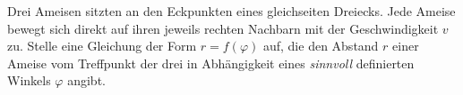 \begin{Exercise}[label = ants, difficulty = 3, title = Ameisen im Dreieck]
	Drei Ameisen sitzten an den Eckpunkten eines gleichseiten Dreiecks. Jede Ameise bewegt sich direkt auf ihren jeweils rechten Nachbarn mit der Geschwindigkeit $v$ zu. Stelle eine Gleichung der Form $r = f\left(\varphi\right)$ auf, die den Abstand $r$ einer Ameise vom Treffpunkt der drei in Abhängigkeit eines \textit{sinnvoll} definierten Winkels $\varphi$ angibt.
\end{Exercise}